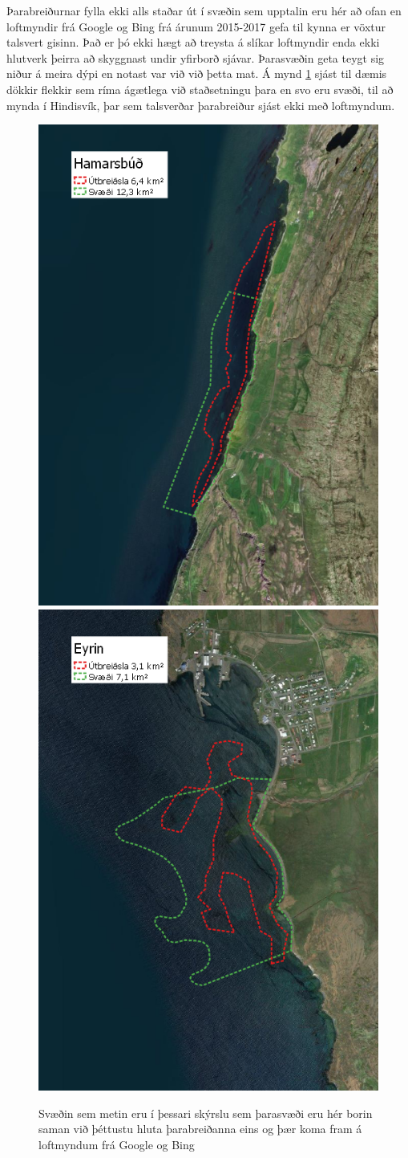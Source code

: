 \documentclass[icelandic,]{book}
\begin{document}
Þarabreiðurnar fylla ekki alls staðar út í svæðin sem upptalin eru hér að ofan en loftmyndir frá Google og Bing frá árunum 2015-2017 gefa til kynna er vöxtur talsvert gisinn. Það er þó ekki hægt að treysta á slíkar loftmyndir enda ekki hlutverk þeirra að skyggnast undir yfirborð sjávar. Þarasvæðin geta teygt sig niður á meira dýpi en notast var við við þetta mat. Á mynd \ref{fig:svaediogskogar} sjást til dæmis dökkir flekkir sem ríma ágætlega við staðsetningu þara en svo eru svæði, til að mynda í Hindisvík, þar sem talsverðar þarabreiður sjást ekki með loftmyndum.

\begin{figure}

{\centering \includegraphics[width=0.5\linewidth]{myndir/feltkort/hamarsb} \includegraphics[width=0.5\linewidth]{myndir/feltkort/eyri} 

}

\caption{Svæðin sem metin eru í þessari skýrslu sem þarasvæði eru hér borin saman við þéttustu hluta þarabreiðanna eins og þær koma fram á loftmyndum frá Google og Bing}\label{fig:svaediogskogar}
\end{figure}
\end{document}
